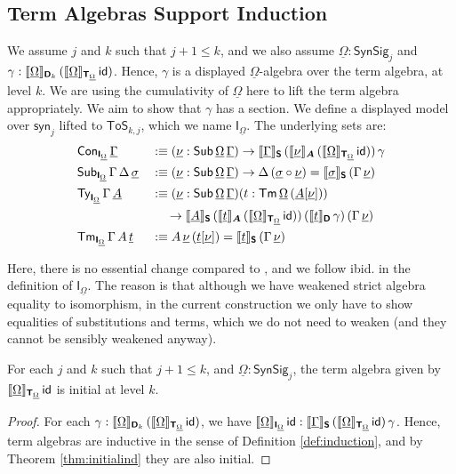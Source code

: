 \documentclass[sigplan,review,anonymous]{acmart}\settopmatter{printfolios=true,printccs=false,printacmref=false}
\newcommand{\ToS}{\mathsf{ToS}}
\newcommand{\syn}{\mathsf{syn}}
\newcommand{\SynSig}{\mathsf{SynSig}}
\newcommand{\bA}{\boldsymbol{A}}
\newcommand{\bT}{\boldsymbol{\mathsf{T}}}
\newcommand{\bS}{\boldsymbol{\mathsf{S}}}
\newcommand{\bD}{\boldsymbol{\mathsf{D}}}
\newcommand{\bI}{\boldsymbol{\mathsf{I}}}
\newcommand{\ul}[1]{\underline{#1}}
\newcommand{\ulGamma}{\ul{\Gamma}}
\newcommand{\ulOmega}{\ul{\Omega}}
\newcommand{\ulsigma}{\ul{\sigma}}
\newcommand{\ulnu}{\ul{\nu}}
\newcommand{\ult}{\ul{t}}
\newcommand{\ulA}{\ul{A}}
\newcommand{\llb}{\llbracket}
\newcommand{\rrb}{\rrbracket}
\begin{document}
\subsection{Term Algebras Support Induction}

\begin{definition} We assume $j$ and $k$ such that $j + 1 \leq k$, and we also assume
$\ulOmega : \SynSig_j$ and $\gamma :
\llb\ulOmega\rrb_{\bD_k}\,(\llb\ulOmega\rrb_{\bT_{\ulOmega}}\,\id)$.  Hence, $\gamma$ is
a displayed $\ulOmega$-algebra over the term algebra, at level $k$. We are using
the cumulativity of $\ulOmega$ here to lift the term algebra appropriately.
We aim to show that $\gamma$ has a section. We define a displayed model over $\syn_j$ lifted
to $\ToS_{k, j}$, which we name $\bI_{\ulOmega}$. The underlying sets are:
\begin{alignat*}{3}
  & \Con_{\bI_{\ulOmega}}\,\ulGamma &&:\equiv (\ulnu : \Sub\,\ulOmega\,\ulGamma)\ra
  \llb\ulGamma\rrb_{\bS}\,(\llb\ulnu\rrb_{\bA}\,(\llb\ulOmega\rrb_{\bT_{\ulOmega}}\,\id))\,\gamma\\
  & \Sub_{\bI_{\ulOmega}}\,\Gamma\,\Delta\,\ulsigma && :\equiv (\ulnu : \Sub\,\ulOmega\,\ulGamma)\ra
    \Delta\,(\ulsigma\circ\ulnu) = \llb\ulsigma\rrb_{\bS}\,(\Gamma\,\ulnu)\\
  & \Ty_{\bI_{\ulOmega}}\,\Gamma\,\ulA &&:\equiv
  (\ulnu : \Sub\,\ulOmega\,\ulGamma)(t : \Tm\,\ulOmega\,(\ulA[\ulnu]))\\
  & && \hspace{1.2em}\ra
  \llb\ulA\rrb_{\bS}\,(\llb\ult\rrb_{\bA}\,(\llb\ulOmega\rrb_{\bT_{\ulOmega}}\,\id))\,
  (\llb\ult\rrb_{\bD}\,\gamma)\,(\Gamma\,\ulnu)\\
  & \Tm_{\bI_{\ulOmega}}\,\Gamma\,A\,\ult &&:\equiv A\,\ulnu\,(\ult[\ulnu]) = \llb\ult\rrb_{\bS}\,(\Gamma\,\ulnu)
\end{alignat*}

Here, there is no essential change compared to \cite{kaposi2019constructing},
and we follow ibid. in the definition of $\bI_{\ulOmega}$. The reason is that although we
have weakened strict algebra equality to isomorphism, in the current
construction we only have to show equalities of substitutions and terms, which
we do not need to weaken (and they cannot be sensibly weakened anyway).
\end{definition}

\begin{theorem} For each $j$ and $k$ such that $j + 1 \leq k$, and $\ulOmega : \SynSig_j$, the term algebra given by $\llb\ulOmega\rrb_{\bT_{\ulOmega}}\,\id$ is initial at level $k$.
\end{theorem}
\begin{proof}
For each $\gamma :
\llb\ulOmega\rrb_{\bD_k}\,(\llb\ulOmega\rrb_{\bT_{\ulOmega}}\,\id)$, we have
$\llb\ulOmega\rrb_{\bI_{\ulOmega}}\,\id :
\llb\ulGamma\rrb_{\bS}\,(\llb\ulOmega\rrb_{\bT_{\ulOmega}}\,\id)\,\gamma$. Hence,
term algebras are inductive in the sense of Definition \ref{def:induction}, and
by Theorem \ref{thm:initialind} they are also initial.
\end{proof}
\end{document}
